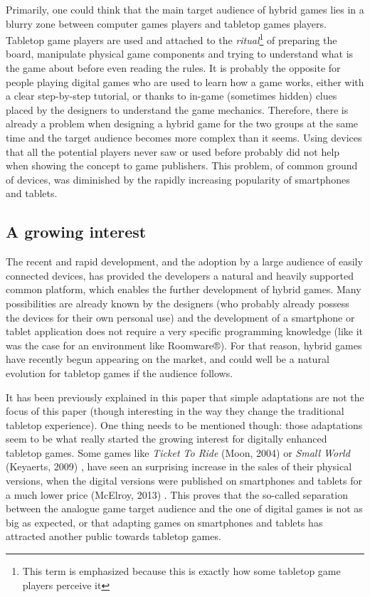 Primarily, one could think that the main target audience of hybrid games lies in a blurry zone between computer games players and tabletop games players. Tabletop game players are used and attached to the \textit{ritual}\footnote{This term is emphasized because this is exactly how some tabletop game players perceive it} of preparing the board, manipulate physical game components and trying to understand what is the game about before even reading the rules.
It is probably the opposite for people playing digital games who are used to learn how a game works, either with a clear step-by-step tutorial, or thanks to in-game (sometimes hidden) clues placed by the designers to understand the game mechanics. 
Therefore, there is already a problem when designing a hybrid game for the two groups at the same time and the target audience becomes more complex than it seems. Using devices that all the potential players never saw or used before probably did not help when showing the concept to game publishers. 
This problem, of common ground of devices, was diminished by the rapidly increasing popularity of smartphones and tablets.

\subsection{A growing interest}
The recent and rapid development, and the adoption by a large audience of easily connected devices, has provided the developers a natural and heavily supported common platform, which enables the further development of hybrid games. Many possibilities are already known by the designers (who probably already possess the devices for their own personal use) and the development of a smartphone or tablet application does not require a very specific programming knowledge (like it was the case for an environment like Roomware®). For that reason, hybrid games have recently begun appearing on the market, and could well be a natural evolution for tabletop games if the audience follows.

It has been previously explained in this paper that simple adaptations are not the focus of this paper (though interesting in the way they change the traditional tabletop experience). 
One thing needs to be mentioned though: those adaptations seem to be what really started the growing interest for digitally enhanced tabletop games. Some games like \textit{Ticket To Ride} (Moon, 2004) \cite{game:ticket} or \textit{Small World} (Keyaerts, 2009) \cite{game:tw}, have seen an surprising increase in the sales of their physical versions, when the digital versions were published on smartphones and tablets for a much lower price (McElroy, 2013) \cite{web:poly}. This proves that the so-called separation between the analogue game target audience and the one of digital games is not as big as expected, or that adapting games on smartphones and tablets has attracted another public towards tabletop games.


